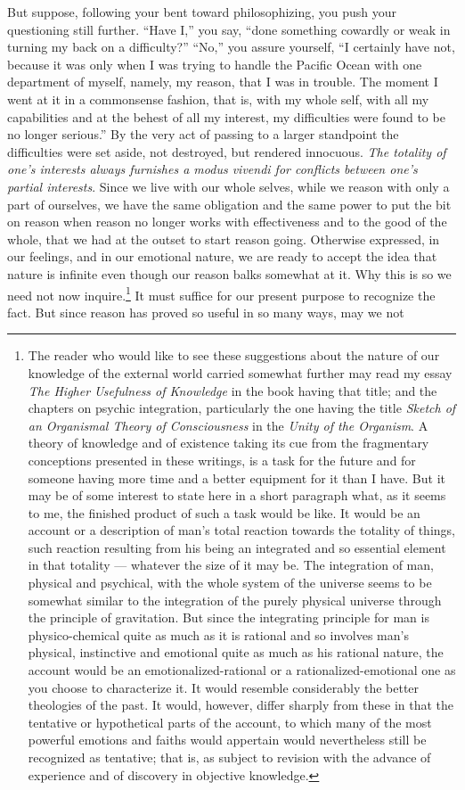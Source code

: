 \documentclass[a4paper, 11pt, oneside, polutonikogreek, english, landscape]{article}
\begin{document}
But suppose, following your bent toward philosophizing, you push your questioning still further. ``Have I,'' you say, ``done something cowardly or weak in turning my back on a difficulty?'' ``No,'' you assure yourself, ``I certainly have not, because it was only when I was trying to handle the Pacific Ocean with one department of myself, namely, my reason, that I was in trouble. The moment I went at it in a commonsense fashion, that is, with my whole self, with all my capabilities and at the behest of all my interest, my difficulties were found to be no longer serious.'' By the very act of passing to a larger standpoint the difficulties were set aside, not destroyed, but rendered innocuous. \emph{The totality of one's interests always furnishes a modus vivendi for conflicts between one's partial interests}. Since we live with our whole selves, while we reason with only a part of ourselves, we have the same obligation and the same power to put the bit on reason when reason no longer works with effectiveness and to the good of the whole, that we had at the outset to start reason going. Otherwise expressed, in our feelings, and in our emotional nature, we are ready to accept the idea that nature is infinite even though our reason balks somewhat at it. Why this is so we need not now inquire.\footnote{The reader who would like to see these suggestions about the nature of our knowledge of the external world carried somewhat further may read my essay \emph{The Higher Usefulness of Knowledge} in the book having that title; and the chapters on psychic integration, particularly the one having the title \emph{Sketch of an Organismal Theory of Consciousness} in the \emph{Unity of the Organism}. A theory of knowledge and of existence taking its cue from the fragmentary conceptions presented in these writings, is a task for the future and for someone having more time and a better equipment for it than I have. But it may be of some interest to state here in a short paragraph what, as it seems to me, the finished product of such a task would be like. It would be an account or a description of man's total reaction towards the totality of things, such reaction resulting from his being an integrated and so essential element in that totality --- whatever the size of it may be. The integration of man, physical and psychical, with the whole system of the universe seems to be somewhat similar to the integration of the purely physical universe through the principle of gravitation. But since the integrating principle for man is physico-chemical quite as much as it is rational and so involves man's physical, instinctive and emotional quite as much as his rational nature, the account would be an emotionalized-rational or a rationalized-emotional one as you choose to characterize it. It would resemble considerably the better theologies of the past. It would, however, differ sharply from these in that the tentative or hypothetical parts of the account, to which many of the most powerful emotions and faiths would appertain would nevertheless still be recognized as tentative; that is, as subject to revision with the advance of experience and of discovery in objective knowledge.} It must suffice for our present purpose to recognize the fact. But since reason has proved so useful in so many ways, may we not 
\end{document}
